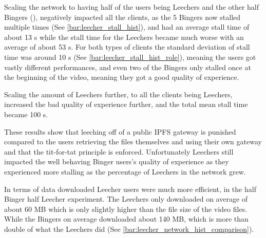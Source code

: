 \if{}



\fi

Scaling the network to having half of the users being Leechers and the other half Bingers (), negatively impacted all the clients, as the 5 Bingers now stalled multiple times (See \autoref{bar:leecher_stall_hist}), and had an average stall time of about 13 \ac{s} while the stall time for the Leechers became much worse with an average of about 53 \ac{s}. For both types of clients the standard deviation of stall time was around 10 \ac{s} (See \autoref{bar:leecher_stall_hist_role}), meaning the users got vastly different performances, and even two of the Bingers only stalled once at the beginning of the video, meaning they got a good quality of experience.

\if{}


\fi
%

Scaling the amount of Leechers further, to all the clients being Leechers, increased the bad quality of experience further, and the total mean stall time became 100 \ac{s}.

These results show that leeching off of a public \ac{IPFS} gateway is punished compared to the users retrieving the files themselves and using their own gateway and that the tit-for-tat principle is enforced. Unfortunately Leechers still impacted the well behaving Binger users's quality of experience as they experienced more stalling as the percentage of Leechers in the network grew.

In terms of data downloaded Leecher users were much more efficient, in the half Binger half Leecher experiment. The Leechers only downloaded on average of about 60 \ac{MB} which is only slightly higher than the file size of the video files. While the Bingers on average downloaded about 140 \ac{MB}, which is more than double of what the Leechers did (See \autoref{bar:leecher_network_hist_comparison}). 

